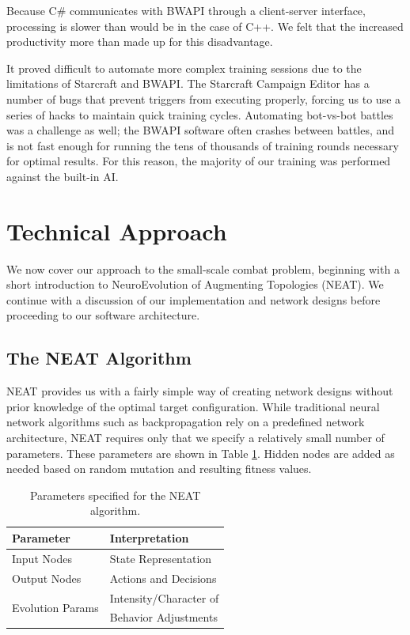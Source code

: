 \documentclass[10pt,a4paper,twocolumn]{article}
\begin{document}
Because C\# communicates with BWAPI through a client-server interface, processing is slower than would be in the case of C++. We felt that the increased productivity more than made up for this disadvantage.

It proved difficult to automate more complex training sessions due to the limitations of Starcraft and BWAPI. The Starcraft Campaign Editor has a number of bugs that prevent triggers from executing properly, forcing us to use a series of hacks to maintain quick training cycles. Automating bot-vs-bot battles was a challenge as well; the BWAPI software often crashes between battles, and is not fast enough for running the tens of thousands of training rounds necessary for optimal results. For this reason, the majority of our training was performed against the built-in AI.

\section{Technical Approach}
\label{sec:tech}

We now cover our approach to the small-scale combat problem, beginning with a short introduction to NeuroEvolution of Augmenting Topologies (NEAT). We continue with a discussion of our implementation and network designs before proceeding to our software architecture.

\subsection{The NEAT Algorithm}
\label{sec:neat}

NEAT provides us with a fairly simple way of creating network designs without prior knowledge of the optimal target configuration. While traditional neural network algorithms such as backpropagation rely on a predefined network architecture, NEAT requires only that we specify a relatively small number of parameters. These parameters are shown in Table \ref{tab:neat_params}. Hidden nodes are added as needed based on random mutation and resulting fitness values.

\begin{table}
\centering
\begin{tabular}{|l|l|}
	\hline
	{\bf Parameter} & {\bf Interpretation}\\ \hline
	Input Nodes & State Representation\\ \hline
	Output Nodes & Actions and Decisions\\ \hline
	\multirow{2}{*}{Evolution Params} &  Intensity/Character of\\
	& Behavior Adjustments\\ \hline
\end{tabular}
\caption{Parameters specified for the NEAT algorithm.}
\label{tab:neat_params}
\end{table}
\end{document}
